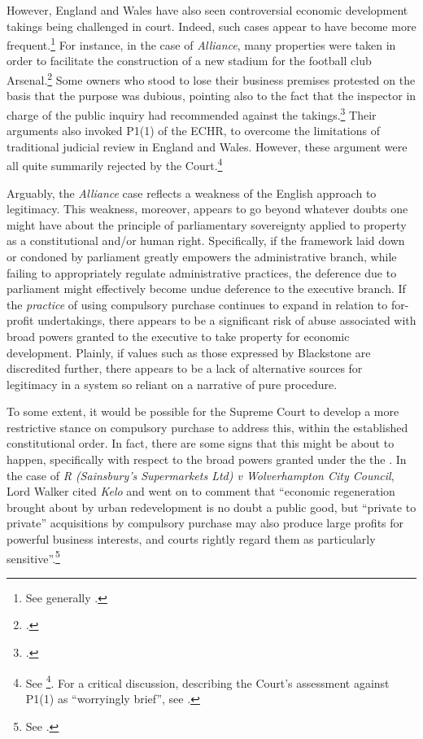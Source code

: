 However, England and Wales have also seen controversial economic development takings being challenged in court. Indeed, such cases appear to have become more frequent.\footnote{See generally \cite{gray11}.} For instance, in the case of {\it Alliance}, many properties were taken in order to facilitate the construction of a new stadium for the football club Arsenal.\footcite{alliance06} Some owners who stood to lose their business premises protested on the basis that the purpose was dubious, pointing also to the fact that the inspector in charge of the public inquiry had recommended against the takings.\footcite[6-7]{alliance06} Their arguments also invoked P1(1) of the ECHR, to overcome the limitations of traditional judicial review in England and Wales. However, these argument were all quite summarily rejected by the Court.\footnote{See \footcite[6-7]{alliance06}. For a critical discussion, describing the Court's assessment against P1(1) as ``worryingly brief'', see \cite{gray11}.}

Arguably, the {\it Alliance} case reflects a weakness of the English approach to legitimacy. This weakness, moreover, appears to go beyond whatever doubts one might have about the principle of parliamentary sovereignty applied to property as a constitutional and/or human right. Specifically, if the framework laid down or condoned by parliament greatly empowers the administrative branch, while failing to appropriately regulate administrative practices, the deference due to parliament might effectively become undue deference to the executive branch. If the {\it practice} of using compulsory purchase continues to expand in relation to for-profit undertakings, there appears to be a significant risk of abuse associated with broad powers granted to the executive to take property for economic development. Plainly, if values such as those expressed by Blackstone are discredited further, there appears to be a lack of alternative sources for legitimacy in a system so reliant on a narrative of pure procedure.

To some extent, it would be possible for the Supreme Court to develop a more restrictive stance on compulsory purchase to address this, within the established constitutional order. In fact, there are some signs that this might be about to happen, specifically with respect to the broad powers granted under the the \cite[226]{tcpa90}. In the case of {\it R (Sainsbury's Supermarkets Ltd) v Wolverhampton City Council}, Lord Walker cited {\it Kelo} and went on to comment that ``economic regeneration brought about by urban redevelopment is no doubt a public good, but ``private to private'' acquisitions by compulsory purchase may also produce large profits for powerful business interests, and courts rightly regard them as particularly sensitive''.\footnote{See \cite[82]{sainsbury10}.}

